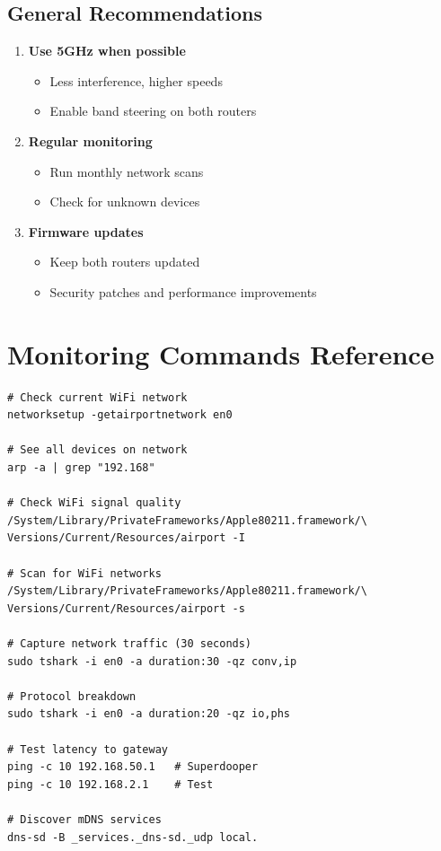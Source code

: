 \documentclass[11pt,letterpaper]{article}
\begin{document}
\subsection{General Recommendations}

\begin{enumerate}
    \item \textbf{Use 5GHz when possible}
    \begin{itemize}
        \item Less interference, higher speeds
        \item Enable band steering on both routers
    \end{itemize}

    \item \textbf{Regular monitoring}
    \begin{itemize}
        \item Run monthly network scans
        \item Check for unknown devices
    \end{itemize}

    \item \textbf{Firmware updates}
    \begin{itemize}
        \item Keep both routers updated
        \item Security patches and performance improvements
    \end{itemize}
\end{enumerate}

\section{Monitoring Commands Reference}

\begin{tcolorbox}[colback=gray!5,colframe=gray!50!black,title=Useful Commands]
\begin{verbatim}
# Check current WiFi network
networksetup -getairportnetwork en0

# See all devices on network
arp -a | grep "192.168"

# Check WiFi signal quality
/System/Library/PrivateFrameworks/Apple80211.framework/\
Versions/Current/Resources/airport -I

# Scan for WiFi networks
/System/Library/PrivateFrameworks/Apple80211.framework/\
Versions/Current/Resources/airport -s

# Capture network traffic (30 seconds)
sudo tshark -i en0 -a duration:30 -qz conv,ip

# Protocol breakdown
sudo tshark -i en0 -a duration:20 -qz io,phs

# Test latency to gateway
ping -c 10 192.168.50.1   # Superdooper
ping -c 10 192.168.2.1    # Test

# Discover mDNS services
dns-sd -B _services._dns-sd._udp local.
\end{verbatim}
\end{tcolorbox}
\end{document}
